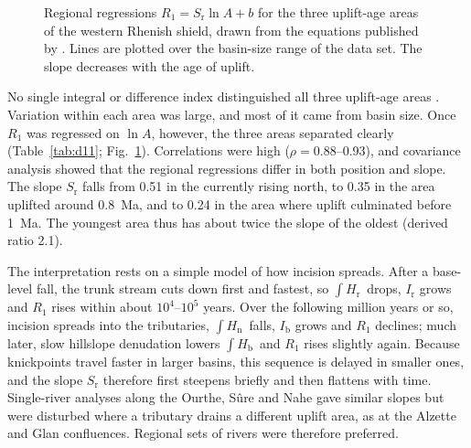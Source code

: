 \documentclass[10pt,a4paper,twocolumn]{article}
\newcommand{\Hb}{\ensuremath{\int\!H_\mathrm{b}}}
\newcommand{\Hn}{\ensuremath{\int\!H_\mathrm{n}}}
\newcommand{\Hr}{\ensuremath{\int\!H_\mathrm{r}}}
\begin{document}
\begin{figure}[t]
\centering
{}
\caption{Regional regressions $R_1=S_\mathrm{r}\ln A+b$ for the three uplift-age areas of the western
Rhenish shield, drawn from the equations published by \citet{Demoulin2011}. Lines are plotted over the
basin-size range of the data set. The slope decreases with the age of uplift.}
\label{fig:d11}
\end{figure}

No single integral or difference index distinguished all three uplift-age areas
\citep{Demoulin2011}. Variation within each area was large, and most of it came from basin size. Once
$R_1$ was regressed on $\ln A$, however, the three areas separated clearly (Table~\ref{tab:d11};
Fig.~\ref{fig:d11}). Correlations were high ($\rho=0.88$--0.93), and covariance analysis showed that
the regional regressions differ in both position and slope. The slope $S_\mathrm{r}$ falls from 0.51 in
the currently rising north, to 0.35 in the area uplifted around 0.8~Ma, and to 0.24 in the area where uplift culminated before 1~Ma. The youngest area thus has about twice the slope of the oldest (derived ratio
2.1).

The interpretation rests on a simple model of how incision spreads. After a base-level fall, the trunk
stream cuts down first and fastest, so \Hr\ drops, $I_\mathrm{r}$ grows and $R_1$ rises within about
$10^4$--$10^5$ years. Over the following million years or so, incision spreads into the tributaries,
\Hn\ falls, $I_\mathrm{b}$ grows and $R_1$ declines; much later, slow hillslope denudation lowers \Hb\
and $R_1$ rises slightly again. Because knickpoints travel faster in larger basins, this sequence is
delayed in smaller ones, and the slope $S_\mathrm{r}$ therefore first steepens briefly and then flattens
with time. Single-river analyses along the Ourthe, Sûre and Nahe gave similar slopes but were disturbed
where a tributary drains a different uplift area, as at the Alzette and Glan confluences. Regional sets
of rivers were therefore preferred.
\end{document}
